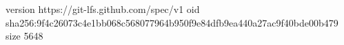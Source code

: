 version https://git-lfs.github.com/spec/v1
oid sha256:9f4c26073c4e1bb068c568077964b950f9e84dfb9ea440a27ac9f40bde00b479
size 5648
